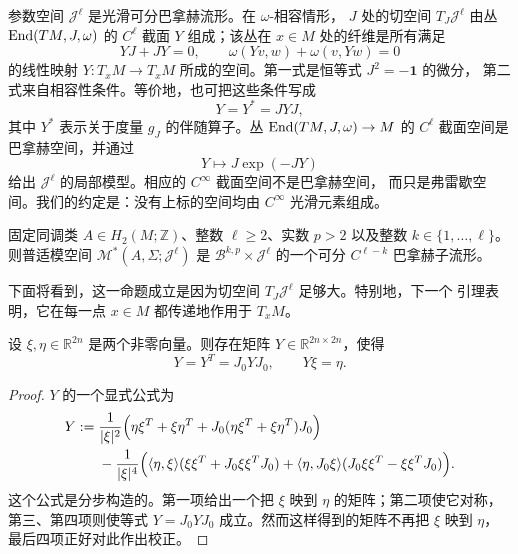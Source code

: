参数空间 $\mathcal J^\ell$ 是光滑可分巴拿赫流形。在 $\omega$-相容情形，
$J$ 处的切空间 $T_J\mathcal J^\ell$ 由丛 $\operatorname{End}(TM,J,\omega)$ 的 $C^\ell$ 截面
$Y$ 组成；该丛在 $x\in M$ 处的纤维是所有满足
\[
  YJ+JY=0,
  \qquad
  \omega(Yv,w)+\omega(v,Yw)=0
\]
的线性映射 $Y:T_xM\to T_xM$ 所成的空间。第一式是恒等式 $J^2=-\mathbf 1$ 的微分，
第二式来自相容性条件。等价地，也可把这些条件写成
\[
  Y=Y^*=JYJ,
\]
其中 $Y^*$ 表示关于度量 $g_J$ 的伴随算子。丛
$\operatorname{End}(TM,J,\omega)\to M$ 的 $C^\ell$ 截面空间是巴拿赫空间，并通过
\[
  Y\longmapsto J\exp(-JY)
\]
给出 $\mathcal J^\ell$ 的局部模型。相应的 $C^\infty$ 截面空间不是巴拿赫空间，
而只是弗雷歇空间。我们的约定是：没有上标的空间均由 $C^\infty$ 光滑元素组成。

\begin{proposition}\label{prop:3-2-1}
固定同调类 $A\in H_2(M;\mathbb Z)$、整数 $\ell\ge2$、实数 $p>2$ 以及整数
$k\in\{1,\ldots,\ell\}$。则普适模空间
$\mathcal M^*(A,\Sigma;\mathcal J^\ell)$ 是
$\mathcal B^{k,p}\times\mathcal J^\ell$ 的一个可分 $C^{\ell-k}$ 巴拿赫子流形。
\end{proposition}

下面将看到，这一命题成立是因为切空间 $T_J\mathcal J^\ell$ 足够大。特别地，下一个
引理表明，它在每一点 $x\in M$ 都传递地作用于 $T_xM$。

\begin{lemma}\label{lem:3-2-2}
设 $\xi,\eta\in\mathbb R^{2n}$ 是两个非零向量。则存在矩阵
$Y\in\mathbb R^{2n\times2n}$，使得
\[
  Y=Y^T=J_0YJ_0,
  \qquad
  Y\xi=\eta.
\]
\end{lemma}

\begin{proof}
$Y$ 的一个显式公式为
\begin{align*}
  Y:={}&\frac1{|\xi|^2}
  \Bigl(\eta\xi^T+\xi\eta^T
  +J_0(\eta\xi^T+\xi\eta^T)J_0\Bigr)\\
  &-\frac1{|\xi|^4}\Bigl(
  \langle\eta,\xi\rangle(\xi\xi^T+J_0\xi\xi^TJ_0)
  +\langle\eta,J_0\xi\rangle(J_0\xi\xi^T-\xi\xi^TJ_0)
  \Bigr).
\end{align*}
这个公式是分步构造的。第一项给出一个把 $\xi$ 映到 $\eta$ 的矩阵；第二项使它对称，
第三、第四项则使等式 $Y=J_0YJ_0$ 成立。然而这样得到的矩阵不再把 $\xi$ 映到
$\eta$，最后四项正好对此作出校正。
\end{proof}

